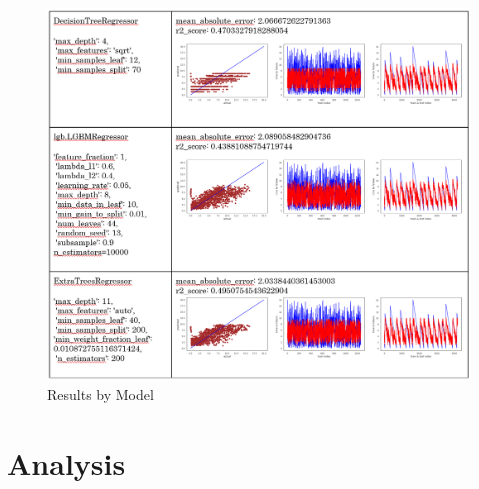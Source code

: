 \documentclass[]{llncs} %
\begin{document}
\begin{figure}
	\centering
	\includegraphics[width=1\linewidth]{../GPUProject/Results2.PNG}
	\caption{Results by Model}
	\label{fig:morethan90percent}
\end{figure}

\section{Analysis}
\end{document}
